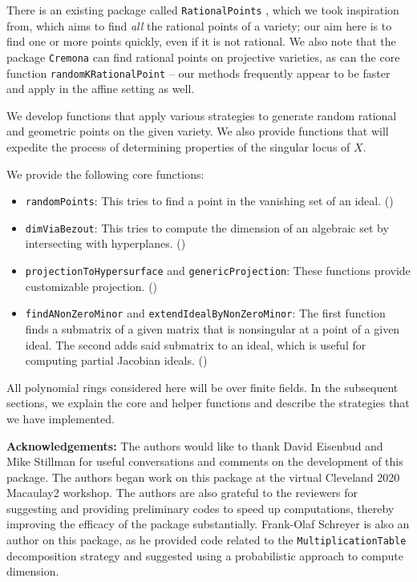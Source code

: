 \documentclass[11pt]{amsart}
\theoremstyle{definition}
\begin{document}
    There is an existing package called {\tt RationalPoints} \cite{RationalPointsSource}, which we took inspiration from, which aims to find \emph{all} the rational points of a variety; our aim here is to find one or more points quickly, even if it is not rational.  We also note that the package {\tt Cremona} \cite{CremonaSource} can find rational points on projective varieties, as can the core function {\tt randomKRationalPoint} \cite{M2} -- our methods frequently appear to be faster and apply in the affine setting as well.

    We develop functions that apply various strategies to generate random rational and geometric points on the given variety. We also provide functions that will expedite the process of determining properties of the singular locus of $X$.%

    We provide the following core functions:
    \begin{itemize}    
    \item {\tt randomPoints}:  This tries to find a point in the vanishing set of an ideal. ()
    \item {\tt dimViaBezout}:  This tries to compute the dimension of an algebraic set by intersecting with hyperplanes.  ()
    \item {\tt projectionToHypersurface} and {\tt genericProjection}: These functions provide customizable projection. () 	
    \item {\tt findANonZeroMinor} and {\tt extendIdealByNonZeroMinor}:  The first function finds a submatrix of a given matrix that is nonsingular at a point of a given ideal.  The second adds said submatrix to an ideal, which is useful for computing partial Jacobian ideals.  ()          
    \end{itemize}

    All polynomial rings considered here will be over finite fields. In the subsequent sections, we explain  the core and helper functions and describe the strategies that we have implemented.

   \vspace{1em}
    \noindent \textbf{Acknowledgements:} The authors would like to thank David Eisenbud and Mike Stillman for useful conversations and comments on the development of this package.  The authors began work on this package at the virtual Cleveland 2020 Macaulay2 workshop. The authors are also grateful to the reviewers for suggesting and providing preliminary codes to speed up computations, thereby improving the efficacy of the package substantially.  Frank-Olaf Schreyer is also an author on this package, as he provided code related to the {\tt MultiplicationTable} decomposition strategy and suggested using a probabilistic approach to compute dimension.
\end{document}

